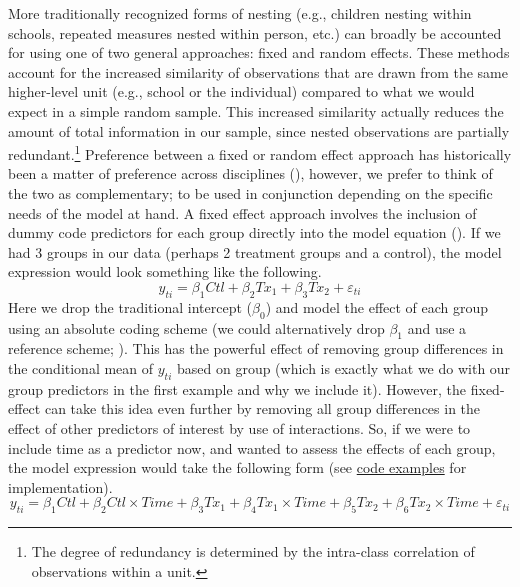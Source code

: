 \documentclass[11pt]{article}
\begin{document}
More traditionally recognized forms of nesting (e.g., children nesting within schools, repeated measures nested within person, etc.) can broadly be accounted for using one of two general approaches: fixed and random effects. These methods account for the increased similarity of observations that are drawn from the same higher-level unit (e.g., school or the individual) compared to what we would expect in a simple random sample. This increased similarity actually reduces the amount of total information in our sample, since nested observations are partially redundant.\footnote{The degree of redundancy is determined by the intra-class correlation of observations within a unit.} Preference between a fixed or random effect approach has historically been a matter of preference across disciplines (\cite{mcneish_fixed_2019}), however, we prefer to think of the two as complementary; to be used in conjunction depending on the specific needs of the model at hand. A fixed effect approach involves the inclusion of dummy code predictors for each group directly into the model equation (\cite{mcneish_fixed_2019}). If we had 3 groups in our data (perhaps 2 treatment groups and a control), the model expression would look something like the following.
%
\begin{equation} \label{eq:22}
y_{ti} = \beta_{1} \mathit{Ctl} + \beta_{2} \mathit{Tx}_{1} + \beta_{3} \mathit{Tx}_{2} + \varepsilon_{ti}
\end{equation}
%
Here we drop the traditional intercept ($\beta_{0}$) and model the effect of each group using an absolute coding scheme (we could alternatively drop $\beta_{1}$ and use a reference scheme; \cite{mcneish_fixed_2019}). This has the powerful effect of removing group differences in the conditional mean of $y_{ti}$ based on group (which is exactly what we do with our group predictors in the first example and why we include it). However, the fixed-effect can take this idea even further by removing all group differences in the effect of other predictors of interest by use of interactions. So, if we were to include time as a predictor now, and wanted to assess the effects of each group, the model expression would take the following form (see \href{https://e-m-mccormick.github.io/static/longitudinal-primer/06-nesting.html#categorical-predictors}{code examples} for implementation).
%
\begin{equation} \label{eq:23}
y_{ti} = \beta_{1} \mathit{Ctl} + \beta_{2} \mathit{Ctl} \times \mathit{Time} + \beta_{3} \mathit{Tx}_{1} + \beta_{4} \mathit{Tx}_{1} \times \mathit{Time} + \beta_{5} \mathit{Tx}_{2} + \beta_{6} \mathit{Tx}_{2} \times \mathit{Time} + \varepsilon_{ti}
\end{equation}
\end{document}
